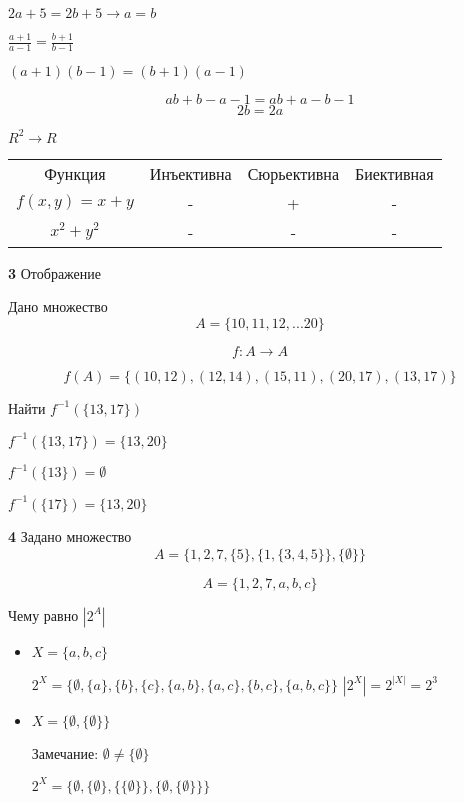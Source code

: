 \documentclass{article}
\begin{document}
$2a + 5 = 2b + 5 \rightarrow a = b $

$\frac{a + 1}{a - 1} = \frac{b + 1}{b - 1}$

$(a + 1)(b - 1) = (b + 1)(a - 1)$

$$ab + b - a - 1 = ab + a - b - 1$$
$$2b = 2a$$
\newpage

$R^2 \rightarrow R$
\begin{center}
\begin{tabular}{ c c c c }
  Функция & Инъективна & Сюрьективна & Биективная \\
  $f(x, y) = x + y$ & -  & +  & - \\
  $x^2 + y^2$ & - & - & - \\
\end{tabular}
\end{center}



\newpage

\textbf{3}
Отображение

Дано множество 
$$A = \{10, 11, 12, ... 20\}$$

$$f : A \rightarrow A$$

$$f(A) = \{(10, 12), (12, 14), (15, 11), (20, 17), (13, 17) \}$$

Найти $f^{-1}(\{13, 17\})$

$f^{-1}(\{13, 17\}) = \{13, 20 \}$

$f^{-1}(\{13\}) = \emptyset$

$f^{-1}(\{17\}) = \{13, 20 \}$

\newpage

\textbf{4} 
Задано множество $$A = \{ 1, 2, 7, \{5\}, \{1, \{ 3,4 ,5 \}\}, \{\emptyset \}\}$$

$$A = \{ 1, 2, 7, a, b, c\}$$

Чему равно $|2^A|$

\begin{itemize}
    \item $X = \{a, b, c\}$
    
    $2^X = \{\emptyset, \{a\}, \{b\}, \{c\}, \{a, b\}, \{a, c\}, \{b, c\}, \{a, b, c\}\}$
    $|2^X| = 2 ^ {|X|} = 2 ^ 3$  
    
    
    \item $X = \{\emptyset, \{ \emptyset \}\}$
    
    Замечание: $\emptyset \neq \{ \emptyset \}$
    
    $2^X = \{ \emptyset, \{\emptyset\}, \{\{ \emptyset \}\}, \{\emptyset, \{  \emptyset \}\}\}$
    
\end{itemize}
\end{document}
